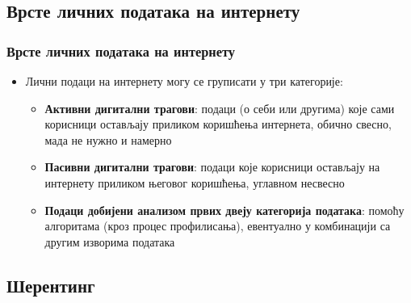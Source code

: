 \documentclass{beamer}
\begin{document}
\subsection{Врсте личних података на интернету}

\begin{frame}[fragile]\frametitle{Врсте личних података на интернету}
	\begin{itemize}	
	\item Лични подаци на интернету могу се груписати у три категорије:	
	\begin{itemize}
		\item\textbf{Активни дигитални трагови}: подаци (о себи или другима) које сами корисници остављају приликом коришћења интернета, обично свесно, мада не нужно и намерно  
		\item\textbf{Пасивни дигитални трагови}: подаци које корисници остављају на интернету приликом његовог коришћења, углавном несвесно
		\item\textbf{Подаци добијени анализом првих двеју категорија података}: помоћу алгоритама  (кроз процес профилисања), евентуално у комбинацији са другим изворима података				
	\end{itemize}
	\end{itemize}
\end{frame}

\subsection{Шерентинг}
\end{document}
